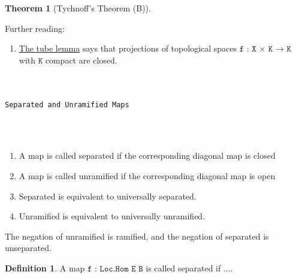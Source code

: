 \documentclass{book}
\theoremstyle{definition}
\newtheorem{definition}{Definition}
\newtheorem{theorem}{Theorem}
\renewcommand{\chapter}[1]{
\newpage
{
\Huge 
\begin{center}
\ \\
\ \\
\thispagestyle{empty}
\texttt{#1}
\end{center}}
\ \\
\ \\
}
\begin{document}

\begin{theorem}[Tychnoff's Theorem (B)]

\end{theorem}

Further reading:
\begin{enumerate}
\item \href{https://en.wikipedia.org/wiki/Tube_lemma}{The tube lemma} says that projections of topological spaces $\texttt{f : X × K → K}$ with $\texttt{K}$ compact are closed.
\end{enumerate}

\chapter{Separated and Unramified Maps}

\begin{enumerate}
\item A map is called separated if the corresponding diagonal map is closed
\item A map is called unramified if the corresponding diagonal map is open
\item Separated is equivalent to universally separated.
\item Unramified is equivalent to universally unramified. 
\end{enumerate}

The negation of unramified is ramified, and the negation of separated is unseparated.

\begin{definition}
A map $\texttt{f : Loc.Hom E B}$ is called separated if ....
\end{definition}
\end{document}
